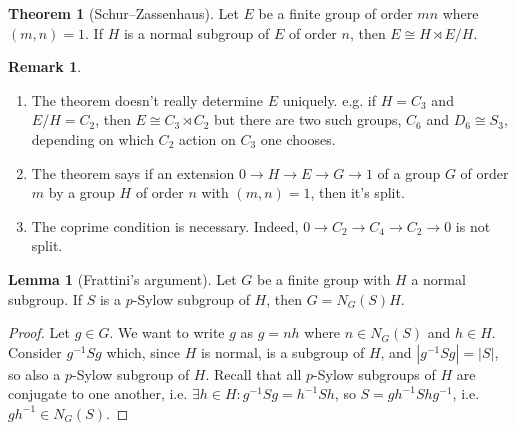 \documentclass{article}
\theoremstyle{definition}
\newtheorem{thm}[defn]{Theorem}
\newtheorem{lemma}[defn]{Lemma}
\newtheorem{remark}[defn]{Remark}
\begin{document}
\begin{thm}[Schur--Zassenhaus]
\label{thm:SchurZassenhaus}
Let $E$ be a finite group of order $mn$ where $(m,n)=1$. If $H$ is a normal subgroup of $E$ of order $n$, then $E\cong H\rtimes E/H$.
\end{thm}
\begin{remark}
\begin{enumerate}
\item The theorem doesn't really determine $E$ uniquely. e.g. if $H=C_3$ and $E/H=C_2$, then $E\cong C_3\rtimes C_2$ but there are two such groups, $C_6$ and $D_6\cong S_3$, depending on which $C_2$ action on $C_3$ one chooses.
\item The theorem says if an extension $0\rightarrow H\rightarrow E\rightarrow G\rightarrow 1$ of a group $G$ of order $m$ by a group $H$ of order $n$ with $(m,n)=1$, then it's split.
\item The coprime condition is necessary. Indeed, $0\rightarrow C_2\rightarrow C_4\rightarrow C_2\rightarrow 0$ is not split.
\end{enumerate}
\end{remark}
\begin{lemma}[Frattini's argument]
Let $G$ be a finite group with $H$ a normal subgroup. If $S$ is a $p$-Sylow subgroup of $H$, then $G=N_G(S)H$.
\end{lemma}
\begin{proof}
Let $g\in G$. We want to write $g$ as $g=nh$ where $n\in N_G(S)$ and $h\in H$. Consider $g^{-1}Sg$ which, since $H$ is normal, is a subgroup of $H$, and $|g^{-1}Sg|=|S|$, so also a $p$-Sylow subgroup of $H$. Recall that all $p$-Sylow subgroups of $H$ are conjugate to one another, i.e. $\exists h\in H:g^{-1}Sg=h^{-1}Sh$, so $S=gh^{-1}Shg^{-1}$, i.e. $gh^{-1}\in N_G(S)$.
\end{proof}
\end{document}
